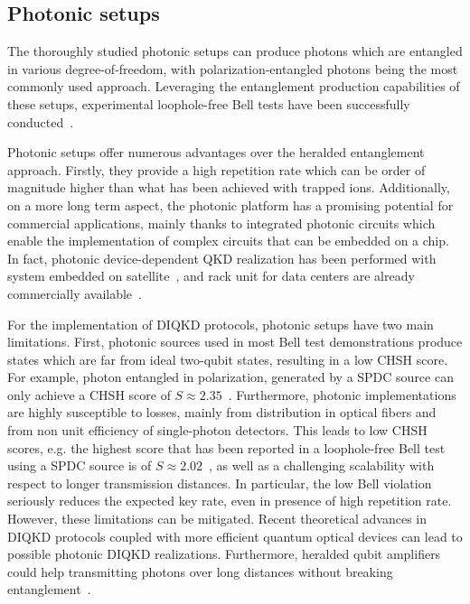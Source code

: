 \subsection{Photonic setups}

The thoroughly studied photonic setups can produce photons which are entangled in various degree-of-freedom, with polarization-entangled photons being the most commonly used approach.
Leveraging the entanglement production capabilities of these setups, experimental loophole-free Bell tests have been successfully conducted~\cite{Giustina2015,Shalm2015,Li2018}.

Photonic setups offer numerous advantages over the heralded entanglement approach.
Firstly, they provide a high repetition rate which can be order of magnitude higher than what has been achieved with trapped ions.
Additionally, on a more long term aspect, the photonic platform has a promising potential for commercial applications, mainly thanks to integrated photonic circuits which enable the implementation of complex circuits that can be embedded on a chip.
In fact, photonic device-dependent QKD realization has been performed with system embedded on satellite~\cite{Liao2017}, and rack unit for data centers are already commercially available~\cite{Pljonkin2018}. 

For the implementation of DIQKD protocols, photonic setups have two main limitations.
First, photonic sources used in most Bell test demonstrations produce states which are far from ideal two-qubit states, resulting in a low CHSH score.
For example, photon entangled in polarization, generated by a SPDC source can only achieve a CHSH score of $S\approx 2.35$~\cite{Vivoli2015b}.
Furthermore, photonic implementations are highly susceptible to losses, mainly from distribution in optical fibers and from non unit efficiency of single-photon detectors.
This leads to low CHSH scores, e.g. the highest score that has been reported in a loophole-free Bell test using a SPDC source is of $S \approx 2.02$~\cite{Liu2021}, as well as a challenging scalability with respect to longer transmission distances.
In particular, the low Bell violation seriously reduces the expected key rate, even in presence of high repetition rate.
However, these limitations can be mitigated.
Recent theoretical advances in DIQKD protocols coupled with more efficient quantum optical devices can lead to possible photonic DIQKD realizations.
Furthermore, heralded qubit amplifiers could help transmitting photons over long distances without breaking entanglement~\cite{Gisin2010}.

